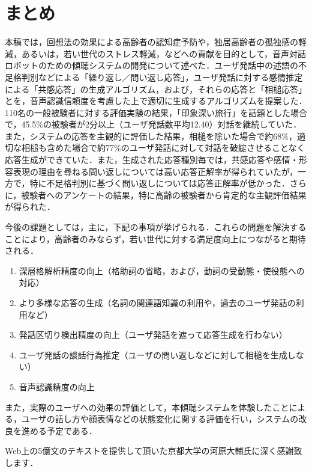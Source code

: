 \documentclass[japanese]{jnlp_1.4}
\begin{document}
\section{まとめ}

本稿では，回想法の効果による高齢者の認知症予防や，独居高齢者の孤独感の軽減，あるいは，若い世代のストレス軽減，などへの貢献を目的として，音声対話ロボットのための傾聴システムの開発について述べた．ユーザ発話中の述語の不足格判別などによる「繰り返し／問い返し応答」，ユーザ発話に対する感情推定による「共感応答」の生成アルゴリズム，および，それらの応答と「相槌応答」とを，音声認識信頼度を考慮した上で適切に生成するアルゴリズムを提案した．110名の一般被験者に対する評価実験の結果，「印象深い旅行」を話題とした場合で，45.5\%の被験者が2分以上（ユーザ発話数平均12.40）対話を継続していた．また，システムの応答を主観的に評価した結果，相槌を除いた場合で約68\%，適切な相槌も含めた場合で約77\%のユーザ発話に対して対話を破綻させることなく応答生成ができていた．また，生成された応答種別毎では，共感応答や感情・形容表現の理由を尋ねる問い返しについては高い応答正解率が得られていたが，一方で，特に不足格判別に基づく問い返しについては応答正解率が低かった．さらに，被験者へのアンケートの結果，特に高齢の被験者から肯定的な主観評価結果が得られた．

今後の課題としては，主に，下記の事項が挙げられる．これらの問題を解決することにより，高齢者のみならず，若い世代に対する満足度向上につながると期待される．
\begin{enumerate}
\item 深層格解析精度の向上（格助詞の省略，および，動詞の受動態・使役態への対応）

\item より多様な応答の生成（名詞の関連語知識の利用や，過去のユーザ発話の利用など）

\item 発話区切り検出精度の向上（ユーザ発話を遮って応答生成を行わない）

\item ユーザ発話の談話行為推定（ユーザの問い返しなどに対して相槌を生成しない）

\item 音声認識精度の向上
\end{enumerate}

また，実際のユーザへの効果の評価として，本傾聴システムを体験したことによる，ユーザの話し方や顔表情などの状態変化に関する評価を行い，システムの改良を進める予定である．


\acknowledgment

Web上の5億文のテキストを提供して頂いた京都大学の河原大輔氏に深く感謝致します．
\end{document}
